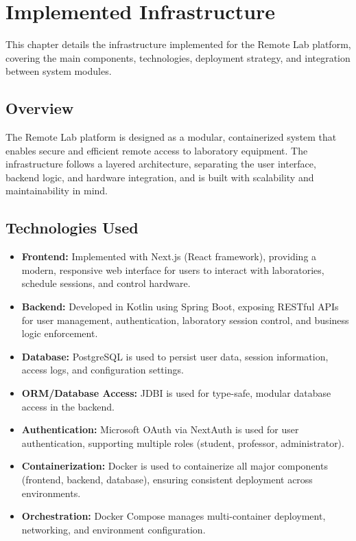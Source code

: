 %
%
\chapter{Implemented Infrastructure} \label{cap:implemented-infrastructure}

This chapter details the infrastructure implemented for the Remote Lab platform, covering the main components, technologies, deployment strategy, and integration between system modules.

\section{Overview}

The Remote Lab platform is designed as a modular, containerized system that enables secure and efficient remote access to laboratory equipment. The infrastructure follows a layered architecture, separating the user interface, backend logic, and hardware integration, and is built with scalability and maintainability in mind.

\section{Technologies Used}

\begin{itemize}
    \item \textbf{Frontend:} Implemented with Next.js (React framework), providing a modern, responsive web interface for users to interact with laboratories, schedule sessions, and control hardware.
    \item \textbf{Backend:} Developed in Kotlin using Spring Boot, exposing RESTful APIs for user management, authentication, laboratory session control, and business logic enforcement.
    \item \textbf{Database:} PostgreSQL is used to persist user data, session information, access logs, and configuration settings.
    \item \textbf{ORM/Database Access:} JDBI is used for type-safe, modular database access in the backend.
    \item \textbf{Authentication:} Microsoft OAuth via NextAuth is used for user authentication, supporting multiple roles (student, professor, administrator).
    \item \textbf{Containerization:} Docker is used to containerize all major components (frontend, backend, database), ensuring consistent deployment across environments.
    \item \textbf{Orchestration:} Docker Compose manages multi-container deployment, networking, and environment configuration.
\end{itemize}


